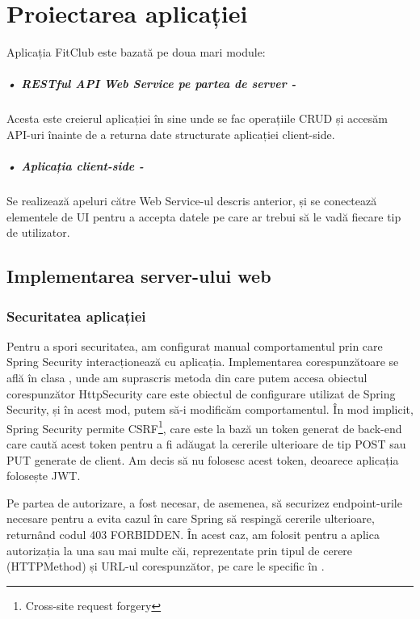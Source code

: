 \chapter{Proiectarea aplicației}
Aplicația FitClub este bazată pe doua mari module:

\paragraph{•  RESTful API Web Service pe partea de server -}Acesta este creierul aplicației în sine unde se fac operațiile CRUD și accesăm API-uri înainte de a returna date structurate aplicației client-side.

\paragraph{•  Aplicația client-side -}Se realizează apeluri către Web Service-ul descris anterior, și se conectează elementele de UI pentru a accepta datele pe care ar trebui să le vadă fiecare tip de utilizator.\newline

\section{Implementarea server-ului web}

\subsection{Securitatea aplicației}
\lstset{frame=tb}

Pentru a spori securitatea, am configurat manual comportamentul prin care Spring Security\cite{.springbootbook} interacționează cu aplicația. Implementarea corespunzătoare se află în clasa , unde am suprascris metoda  din care putem accesa obiectul corespunzător HttpSecurity care este obiectul de configurare utilizat de Spring Security, și în acest mod, putem să-i modificăm comportamentul. În mod implicit, Spring Security permite CSRF\footnote{Cross-site request forgery}, care este la bază un token generat de back-end care caută acest token pentru a fi adăugat la cererile ulterioare de tip POST sau PUT generate de client. Am decis să nu folosesc acest token, deoarece aplicația folosește JWT.\newline

Pe partea de autorizare, a fost necesar, de asemenea, să securizez endpoint-urile necesare pentru a evita cazul în care Spring să respingă cererile ulterioare, returnând codul 403 FORBIDDEN.\newline
În acest caz, am folosit  pentru a aplica autorizația la una sau mai multe căi, reprezentate prin tipul de cerere (HTTPMethod) și URL-ul corespunzător, pe care le specific în .\newline

